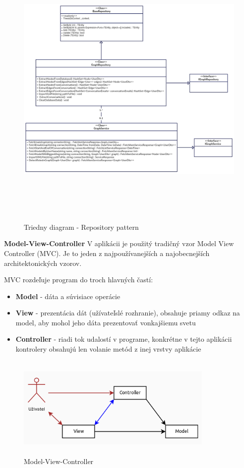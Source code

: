 \documentclass[slovak,master,public,dept460,male,cpdeclaration,oneside]{diploma}
\begin{document}
\begin{figure}[H]
\centering
\includegraphics[width=13cm, height=14cm]{figures/diagram_class}
\caption{Triedny diagram - Repository pattern}
\end{figure}



\textbf{Model-View-Controller}
V aplikácii je použitý tradičný vzor Model View Controller (MVC). Je to jeden z najpoužívanejších a najobecnejších architektonických vzorov. 

MVC rozdeľuje program do troch hlavných častí:
\begin{itemize}
\item \textbf{Model} - dáta a súvisiace operácie 
\item \textbf{View} - prezentácia dát (užívateľslé rozhranie), obsahuje priamy odkaz na model, aby mohol jeho dáta prezentovať vonkajšiemu svetu
\item \textbf{Controller} - riadi tok udalostí v programe, konkrétne v tejto aplikácii kontrolery obsahujú len volanie metód z inej vrstvy aplikácie
\end{itemize}

\begin{figure}[H]
\centering
\includegraphics[width=9.5cm, height=5cm]{figures/MVC}
\caption{Model-View-Controller}
\end{figure}
\end{document}
